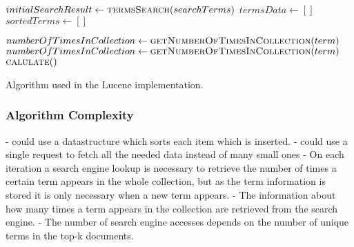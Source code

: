 \begin{algorithm}
  \begin{algorithmic}
    \State $initialSearchResult \gets \Call{termsSearch}{searchTerms}$
    \State $termsData \gets [ ]$
    \State $sortedTerms \gets [ ]$

        \State $numberOfTimesInCollection \gets \Call{getNumberOfTimesInCollection}{term}$
        \State $numberOfTimesInCollection \gets \Call{getNumberOfTimesInCollection}{term}$
        \State {}
      \EndFor
    \EndFor
      \State $\Call{calulate}$
    \EndFor

  \end{algorithmic}
  \caption{Algorithm used in the Lucene implementation.}
\end{algorithm}

\subsubsection{Algorithm Complexity}
- could use a datastructure which sorts each item which is inserted.
- could use a single request to fetch all the needed data instead of many small ones
- On each iteration a search engine lookup is necessary to retrieve the number of times a certain term appears in the whole collection,
but as the term information is stored it is only necessary when a new term appears.
- The information about how many times a term appears in the collection are retrieved from the search engine.
- The number of search engine accesses depends on the number of unique terms in the top-k documents.
